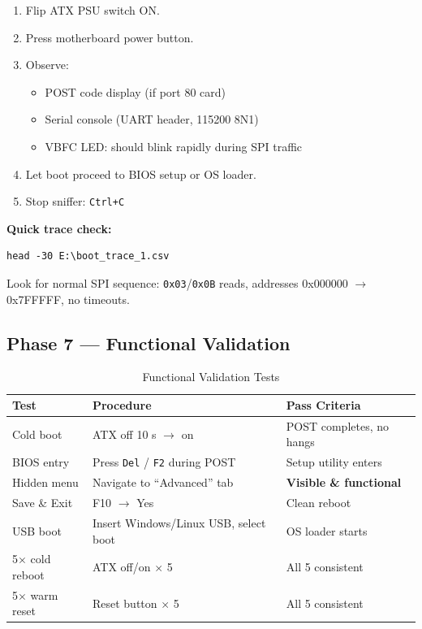 \begin{enumerate}
    \item Flip ATX PSU switch ON.
    \item Press motherboard power button.
    \item Observe:
    \begin{itemize}
        \item POST code display (if port 80 card)
        \item Serial console (UART header, 115200 8N1)
        \item VBFC LED: should blink rapidly during SPI traffic
    \end{itemize}
    \item Let boot proceed to BIOS setup or OS loader.
    \item Stop sniffer: \texttt{Ctrl+C}
\end{enumerate}

\textbf{Quick trace check:}
\begin{lstlisting}[style=vbfcStyle]
head -30 E:\boot_trace_1.csv
\end{lstlisting}

Look for normal SPI sequence: \texttt{0x03}/\texttt{0x0B} reads, addresses 0x000000 $\to$ 0x7FFFFF, no timeouts.

\subsection*{Phase 7 — Functional Validation}

\begin{table}[h]
\centering
\caption{Functional Validation Tests}
\label{tab:func_val}
\begin{tabular}{@{}lll@{}}
\toprule
\textbf{Test} & \textbf{Procedure} & \textbf{Pass Criteria} \\
\midrule
Cold boot & ATX off 10 s $\to$ on & POST completes, no hangs \\
BIOS entry & Press \texttt{Del} / \texttt{F2} during POST & Setup utility enters \\
Hidden menu & Navigate to ``Advanced'' tab & \textbf{Visible \& functional} \\
Save \& Exit & F10 $\to$ Yes & Clean reboot \\
USB boot & Insert Windows/Linux USB, select boot & OS loader starts \\
5$\times$ cold reboot & ATX off/on $\times$ 5 & All 5 consistent \\
5$\times$ warm reset & Reset button $\times$ 5 & All 5 consistent \\
\bottomrule
\end{tabular}
\end{table}


